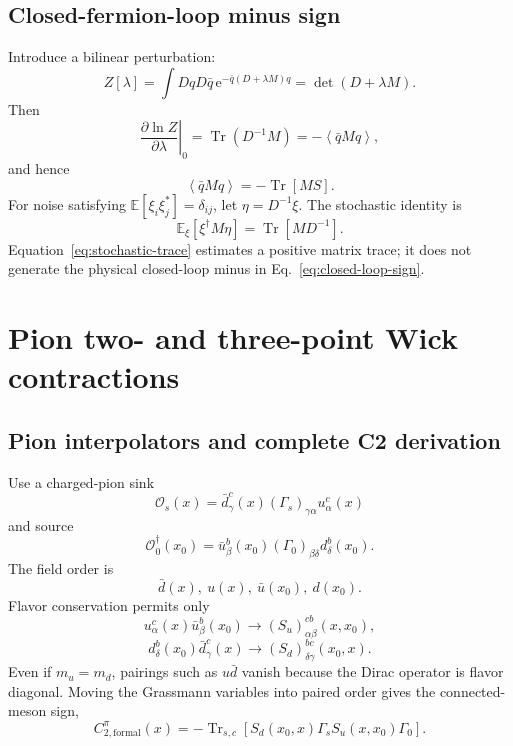 \documentclass[11pt,a4paper]{article}
\numberwithin{equation}{section}
\newcommand{\ee}{\mathrm{e}}
\newcommand{\Tr}{\operatorname{Tr}}
\newcommand{\Trsc}{\operatorname{Tr}_{s,c}}
\newcommand{\avg}[1]{\left\langle #1\right\rangle}
\newcommand{\cO}{\mathcal{O}}
\begin{document}
\subsection{Closed-fermion-loop minus sign}

Introduce a bilinear perturbation:
\begin{equation}
 Z[\lambda]
 =\int DqD\bar q\,
   \ee^{-\bar q(D+\lambda M)q}
 =\det(D+\lambda M).
\end{equation}
Then
\begin{equation}
 \left.\frac{\partial\ln Z}{\partial\lambda}\right|_0
 =\Tr(D^{-1}M)
 =-\avg{\bar qMq},
\end{equation}
and hence
\begin{equation}
 \boxed{\avg{\bar qMq}=-\Tr[MS].}
 \label{eq:closed-loop-sign}
\end{equation}
For noise satisfying
\(\mathbb E[\xi_i\xi_j^*]=\delta_{ij}\), let
\(\eta=D^{-1}\xi\).  The stochastic identity is
\begin{equation}
 \mathbb E_\xi[\xi^\dagger M\eta]
 =\Tr[MD^{-1}].
 \label{eq:stochastic-trace}
\end{equation}
Equation~\eqref{eq:stochastic-trace} estimates a positive matrix trace; it
does not generate the physical closed-loop minus in
Eq.~\eqref{eq:closed-loop-sign}.

\section{Pion two- and three-point Wick contractions}

\subsection{Pion interpolators and complete C2 derivation}

Use a charged-pion sink
\begin{equation}
 \cO_s(x)=\bar d_\gamma^c(x)
 (\Gamma_s)_{\gamma\alpha}u_\alpha^c(x)
\end{equation}
and source
\begin{equation}
 \cO_0^\dagger(x_0)
 =\bar u_\beta^b(x_0)
 (\Gamma_0)_{\beta\delta}d_\delta^b(x_0).
\end{equation}
The field order is
\begin{equation}
 \bar d(x),\ u(x),\ \bar u(x_0),\ d(x_0).
\end{equation}
Flavor conservation permits only
\begin{equation}
 u_\alpha^c(x)\bar u_\beta^b(x_0)
 \longrightarrow
 (S_u)_{\alpha\beta}^{cb}(x,x_0),
\end{equation}
\begin{equation}
 d_\delta^b(x_0)\bar d_\gamma^c(x)
 \longrightarrow
 (S_d)_{\delta\gamma}^{bc}(x_0,x).
\end{equation}
Even if \(m_u=m_d\), pairings such as \(u\bar d\) vanish because the Dirac
operator is flavor diagonal.  Moving the Grassmann variables into paired
order gives the connected-meson sign,
\begin{equation}
 C_{2,\mathrm{formal}}^\pi(x)
 =-\Trsc\left[
 S_d(x_0,x)\Gamma_sS_u(x,x_0)\Gamma_0
 \right].
 \label{eq:pion-C2-formal}
\end{equation}
\end{document}
